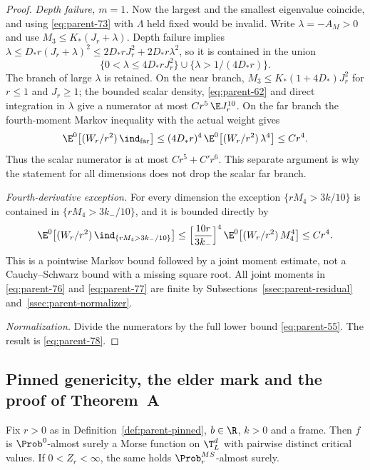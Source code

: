 \begin{proof}
\emph{Depth failure, $m=1$.} Now the largest and the smallest eigenvalue coincide, and using \eqref{eq:parent-73} with $\Lambda$ held fixed would be invalid. Write $\lambda=-A_M>0$ and use $M_3\le K_*(J_r+\lambda)$. Depth failure implies $\lambda\le D_*r(J_r+\lambda)^2\le2D_*rJ_r^2+2D_*r\lambda^2$, so it is contained in the union
\begin{equation}\label{eq:parent-75}
\bigl\{0<\lambda\le4D_*rJ_r^2\bigr\}\cup\bigl\{\lambda>1/(4D_*r)\bigr\}.
\end{equation}
The branch of large $\lambda$ is retained. On the near branch, $M_3\le K_*(1+4D_*)J_r^2$ for $r\le1$ and $J_r\ge1$; the bounded scalar density, \eqref{eq:parent-62} and direct integration in $\lambda$ give a numerator at most $Cr^5\,\E J_r^{10}$. On the far branch the fourth-moment Markov inequality with the actual weight gives
\begin{equation}\label{eq:parent-76}
\E^0\bigl[(W_r/r^2)\,\ind_{\rm far}\bigr]\le(4D_*r)^4\,\E^0\bigl[(W_r/r^2)\,\lambda^4\bigr]\le Cr^4 .
\end{equation}
Thus the scalar numerator is at most $Cr^5+C'r^6$. This separate argument is why the statement for all dimensions does not drop the scalar far branch.

\emph{Fourth-derivative exception.} For every dimension the exception $\{rM_4>3k/10\}$ is contained in $\{rM_4>3k_-/10\}$, and it is bounded directly by
\begin{equation}\label{eq:parent-77}
\E^0\bigl[(W_r/r^2)\,\ind_{\{rM_4>3k_-/10\}}\bigr]\le\Bigl[\frac{10r}{3k_-}\Bigr]^4\,\E^0\bigl[(W_r/r^2)\,M_4^4\bigr]\le Cr^4 .
\end{equation}
This is a pointwise Markov bound followed by a joint moment estimate, not a Cauchy--Schwarz bound with a missing square root. All joint moments in \eqref{eq:parent-76} and \eqref{eq:parent-77} are finite by Subsections~\ref{ssec:parent-residual} and~\ref{ssec:parent-normalizer}.

\emph{Normalization.} Divide the numerators by the full lower bound \eqref{eq:parent-55}. The result is \eqref{eq:parent-78}.
\end{proof}

\subsection{Pinned genericity, the elder mark and the proof of Theorem~A}\label{ssec:parent-generic}

\begin{lemma}\label{lem:parent-generic}
Fix $r>0$ as in Definition~\ref{def:parent-pinned}, $b\in\R$, $k>0$ and a frame. Then $f$ is $\Prob^0$-almost surely a Morse function on $\T^d_L$ with pairwise distinct critical values. If $0<Z_r<\infty$, the same holds $\Prob^{MS}_r$-almost surely.
\end{lemma}


